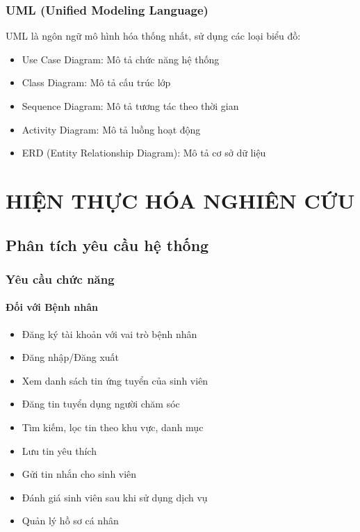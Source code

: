 \documentclass[a4paper,13pt]{extreport}
\begin{document}
\subsection{UML (Unified Modeling Language)}
UML là ngôn ngữ mô hình hóa thống nhất, sử dụng các loại biểu đồ:
\begin{itemize}
    \item Use Case Diagram: Mô tả chức năng hệ thống
    \item Class Diagram: Mô tả cấu trúc lớp
    \item Sequence Diagram: Mô tả tương tác theo thời gian
    \item Activity Diagram: Mô tả luồng hoạt động
    \item ERD (Entity Relationship Diagram): Mô tả cơ sở dữ liệu
\end{itemize}


\chapter{HIỆN THỰC HÓA NGHIÊN CỨU}

\section{Phân tích yêu cầu hệ thống}

\subsection{Yêu cầu chức năng}

\subsubsection{Đối với Bệnh nhân}
\begin{itemize}
    \item Đăng ký tài khoản với vai trò bệnh nhân
    \item Đăng nhập/Đăng xuất
    \item Xem danh sách tin ứng tuyển của sinh viên
    \item Đăng tin tuyển dụng người chăm sóc
    \item Tìm kiếm, lọc tin theo khu vực, danh mục
    \item Lưu tin yêu thích
    \item Gửi tin nhắn cho sinh viên
    \item Đánh giá sinh viên sau khi sử dụng dịch vụ
    \item Quản lý hồ sơ cá nhân
\end{itemize}
\end{document}
